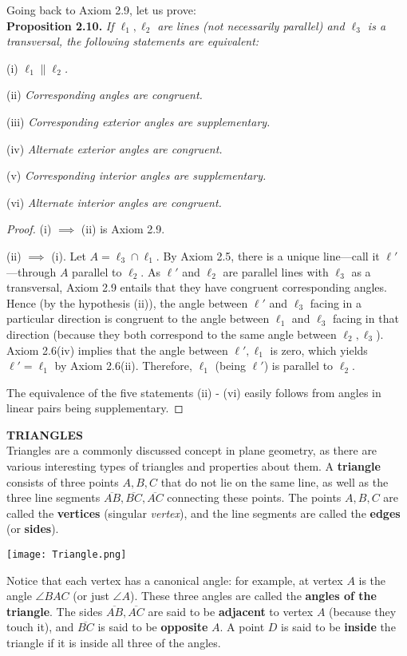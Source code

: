 \documentclass[leqno]{book}
\begin{document}
Going back to Axiom 2.9, let us prove:\\

\noindent\textbf{Proposition 2.10.} \emph{If $\ell_1,\ell_2$ are lines (not necessarily parallel) and $\ell_3$ is a transversal, the following statements are equivalent:}

(i) \emph{$\ell_1\parallel\ell_2$.}

(ii) \emph{Corresponding angles are congruent.}

(iii) \emph{Corresponding exterior angles are supplementary.}

(iv) \emph{Alternate exterior angles are congruent.}

(v) \emph{Corresponding interior angles are supplementary.}

(vi) \emph{Alternate interior angles are congruent.}
\begin{proof}
(i) $\implies$ (ii) is Axiom 2.9.

(ii) $\implies$ (i). Let $A=\ell_3\cap\ell_1$.  By Axiom 2.5, there is a unique line\----call it $\ell'$\----through $A$ parallel to $\ell_2$.  As $\ell'$ and $\ell_2$ are parallel lines with $\ell_3$ as a transversal, Axiom 2.9 entails that they have congruent corresponding angles.  Hence (by the hypothesis (ii)), the angle between $\ell'$ and $\ell_3$ facing in a particular direction is congruent to the angle between $\ell_1$ and $\ell_3$ facing in that direction (because they both correspond to the same angle between $\ell_2,\ell_3$).  Axiom 2.6(iv) implies that the angle between $\ell',\ell_1$ is zero, which yields $\ell'=\ell_1$ by Axiom 2.6(ii).  Therefore, $\ell_1$ (being $\ell'$) is parallel to $\ell_2$.

The equivalence of the five statements (ii) - (vi) easily follows from angles in linear pairs being supplementary.
\end{proof}

\noindent\textbf{TRIANGLES}\\

\noindent Triangles are a commonly discussed concept in plane geometry, as there are various interesting types of triangles and properties about them.  A \textbf{triangle} consists of three points $A,B,C$ that do not lie on the same line, as well as the three line segments $\overline{AB},\overline{BC},\overline{AC}$ connecting these points.  The points $A,B,C$ are called the \textbf{vertices} (singular \emph{vertex}), and the line segments are called the \textbf{edges} (or \textbf{sides}).
\begin{center}\texttt{[image: Triangle.png]}\end{center}
Notice that each vertex has a canonical angle: for example, at vertex $A$ is the angle $\angle BAC$ (or just $\angle A$).  These three angles are called the \textbf{angles of the triangle}.  The sides $\overline{AB},\overline{AC}$ are said to be \textbf{adjacent} to vertex $A$ (because they touch it), and $\overline{BC}$ is said to be \textbf{opposite} $A$.  A point $D$ is said to be \textbf{inside} the triangle if it is inside all three of the angles.
\end{document}
